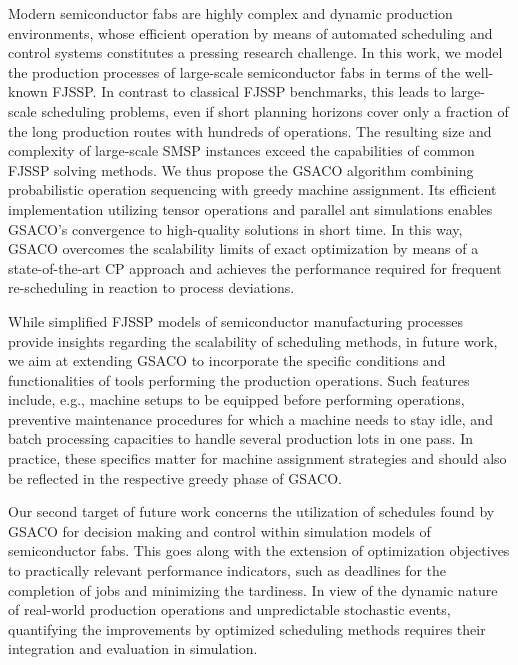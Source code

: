 \documentclass[runningheads]{llncs}
\begin{document}
Modern semiconductor fabs are highly complex and dynamic production
environments, whose efficient operation by means of automated scheduling
and control systems constitutes a pressing research challenge.
In this work, we model the production processes of large-scale
semiconductor fabs in terms of the well-known FJSSP.
In contrast to classical FJSSP benchmarks,
this leads to large-scale scheduling problems,
even if short planning horizons cover only a fraction of the long
production routes with hundreds of operations.
The resulting size and complexity of large-scale SMSP instances
exceed the capabilities of common FJSSP solving methods.
We thus propose the GSACO algorithm combining probabilistic
operation sequencing with greedy machine assignment.
Its efficient implementation utilizing tensor operations and
parallel ant simulations enables GSACO's convergence to high-quality
solutions in short time.
In this way, GSACO overcomes the scalability limits of
exact optimization by means of a state-of-the-art CP approach
and achieves the performance required for frequent re-scheduling
in reaction to process deviations. %


While simplified FJSSP models of semiconductor manufacturing processes
provide insights regarding the scalability of scheduling methods,
in future work, we aim at extending GSACO to incorporate the specific
conditions and functionalities of tools performing the production operations.
Such features include, e.g.,
machine setups to be equipped before performing operations,
preventive maintenance procedures for which a machine needs to stay idle, and
batch processing capacities to handle several production lots in one pass.
In practice, these specifics matter for machine assignment strategies
and should also be reflected in the respective greedy phase of GSACO.

Our second target of future work concerns the utilization of schedules 
found by GSACO for decision making and control within simulation models
of semiconductor fabs.
This goes along with the extension of optimization objectives to
practically relevant performance indicators, such as deadlines for the
completion of jobs and minimizing the tardiness.
In view of the dynamic nature of real-world production operations and
unpredictable stochastic events,
quantifying the improvements by optimized scheduling methods
requires their integration and evaluation in simulation.


\end{document}
